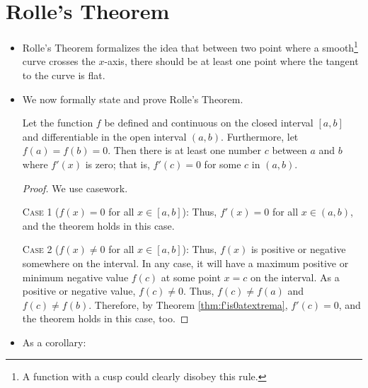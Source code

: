 \documentclass[../main.tex]{subfiles}
\begin{document}
\section{Rolle's Theorem}
\begin{itemize}
    \item Rolle's Theorem formalizes the idea that between two point where a smooth\footnote{A function with a cusp could clearly disobey this rule.} curve crosses the $x$-axis, there should be at least one point where the tangent to the curve is flat.
    \item We now formally state and prove Rolle's Theorem.
    \begin{thm}
        Let the function $f$ be defined and continuous on the closed interval $[a,b]$ and differentiable in the open interval $(a,b)$. Furthermore, let $f(a)=f(b)=0$. Then there is at least one number $c$ between $a$ and $b$ where $f'(x)$ is zero; that is, $f'(c)=0$ for some $c$ in $(a,b)$.
        \begin{proof}
            We use casework.\par
            \textsc{Case 1} ($f(x)=0$ for all $x\in[a,b]$): Thus, $f'(x)=0$ for all $x\in(a,b)$, and the theorem holds in this case.\par
            \textsc{Case 2} ($f(x)\neq 0$ for all $x\in[a,b]$): Thus, $f(x)$ is positive or negative somewhere on the interval. In any case, it will have a maximum positive or minimum negative value $f(c)$ at some point $x=c$ on the interval. As a positive or negative value, $f(c)\neq 0$. Thus, $f(c)\neq f(a)$ and $f(c)\neq f(b)$. Therefore, by Theorem \ref{thm:f'is0atextrema}, $f'(c)=0$, and the theorem holds in this case, too.
        \end{proof}
    \end{thm}
    \item As a corollary: 
\end{itemize}
\end{document}
